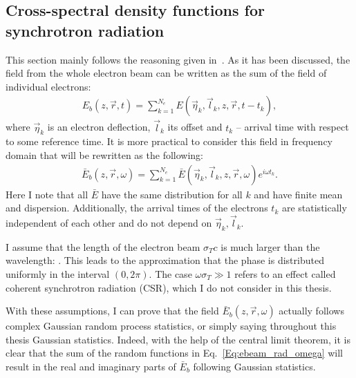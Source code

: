 \subsection{Cross-spectral density functions for synchrotron radiation}   
    
    This section mainly follows the reasoning given in~\cite{geloni_statistical_2006}. As it has been discussed, the field from the whole electron beam can be written as the sum of the field of individual electrons:
    \begin{align}
        E_b(z, \vec{r}, t) = \sum_{k=1}^{N_e} E(\vec{\eta}_k, \vec{l}_k, z, \vec{r}, t - t_k), 
    \end{align}
    where $\vec{\eta}_k$ is an electron deflection, $\vec{l}_k$ its offset and $t_k$ -- arrival time with respect to some reference time. It is more practical to consider this field in frequency domain that will be rewritten as the following: 
    \begin{align}
        \bar{E}_b(z, \vec{r}, \omega) = \sum_{k=1}^{N_e} \bar{E}(\vec{\eta}_k, \vec{l}_k, z, \vec{r}, \omega)e^{i \omega t_k}.
        \label{Eq:ebeam_rad_omega}
    \end{align}   
    Here I note that all $\bar{E}$ have the same distribution for all $k$ and have finite mean and dispersion. Additionally, the arrival times of the electrons $t_k$ are statistically independent of each other and do not depend on $\vec{\eta}_k, \vec{l}_k$.
    
    I assume that the length of the electron beam $\sigma_T c$ is much larger than the wavelength: . This leads to the approximation that the phase is distributed uniformly in the interval $(0, 2\pi)$. The case $\omega \sigma_T \gg 1$ refers to an effect called coherent synchrotron radiation (CSR), which I do not consider in this thesis.
    
    With these assumptions, I can prove that the field $\bar{E}_b(z, \vec{r}, \omega)$ actually follows complex Gaussian random process statistics, or simply saying throughout this thesis Gaussian statistics. Indeed, with the help of the central limit theorem, it is clear that the sum of the random functions in Eq.~\ref{Eq:ebeam_rad_omega} will result in the real and imaginary parts of $\bar{E}_b$ following Gaussian statistics.
    
